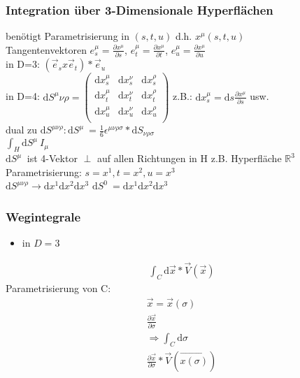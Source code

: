 \documentclass[a4paper]{article}
\begin{document}
\subsubsection{Integration über 3-Dimensionale Hyperflächen}
benötigt Parametrisierung in $(s,t,u)$ d.h. $x^\mu(s,t,u)$\\
Tangentenvektoren $e^\mu_s=\frac{\partial x^\mu}{\partial s}$,
$e^\mu_t=\frac{\partial x^\mu}{\partial t}$, $e^\mu_u=\frac{\partial
x^\mu}{\partial u}$\\
in D=3: $(\vec{e}_s x \vec{e}_t) * \vec{e}_u$\\
in D=4: $\mathrm{d}S^\mu\nu\rho=\begin{pmatrix} 
\mathrm{d}x^\mu_s & \mathrm{d}x^\nu_s & \mathrm{d}x^\rho_s \\
\mathrm{d}x^\mu_t & \mathrm{d}x^\nu_t & \mathrm{d}x^\rho_t \\ 
\mathrm{d}x^\mu_u & \mathrm{d}x^\nu_u & \mathrm{d}x^\rho_u \\\end{pmatrix}
$
z.B.: $\mathrm{d}x^\mu_s=\mathrm{d}s\frac{\partial x^\mu}{\partial s}$ usw.\\
dual zu $\mathrm{d}S^{\mu\nu\rho}: \mathrm{d}S^\mu~=\frac{1}{6}
\epsilon^{\mu\nu\rho\sigma}*\mathrm{d}S_{\nu\rho\sigma}$\\
$\int_H \mathrm{d}S^\mu~ I_\mu$\\
$\mathrm{d}S^\mu~$ ist 4-Vektor
$\perp$ auf allen Richtungen in H
z.B. Hyperfläche $\mathbb{R}^3$
Parametrisierung: $s=x^1,t=x^2,u=x^3$\\
$\mathrm{d}S^{\mu\nu\rho}\rightarrow \mathrm{d}x^1\mathrm{d}x^2\mathrm{d}x^3$
$\mathrm{d}S^{0}~=\mathrm{d}x^1\mathrm{d}x^2\mathrm{d}x^3$


\subsubsection{Wegintegrale}
\begin{itemize}
  \item in $D=3$
\end{itemize}
\begin{align}
\int_C \mathrm{d}\vec{x}*\vec{V}(\vec{x})
\end{align}
Parametrisierung von C:
\begin{align}
\vec{x}=\vec{x}(\sigma)\\
\frac{\partial\vec{x}}{\partial\sigma}\\
\Rightarrow\int_C \mathrm{d}\sigma\\
\frac{\partial\vec{x}}{\partial\sigma}*\vec{V}(\vec{x(\sigma)})
\end{align}
\end{document}
